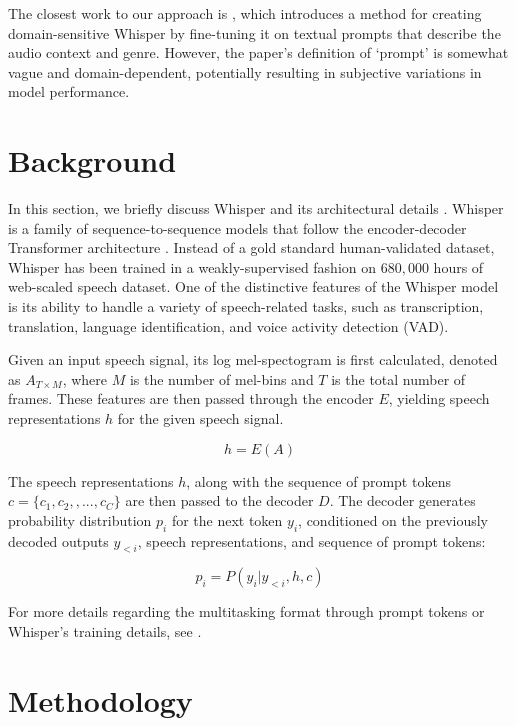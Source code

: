 \documentclass{article}
\begin{document}
The closest work to our approach is \cite{zeroshotdomain}, which introduces a method for creating domain-sensitive Whisper by fine-tuning it on textual prompts that describe the audio context and genre. However, the paper's definition of `prompt' is somewhat vague and domain-dependent, potentially resulting in subjective variations in model performance.



\section{Background}

In this section, we briefly discuss Whisper and its architectural details \cite{whisper}. Whisper is a family of sequence-to-sequence models that follow the encoder-decoder Transformer architecture \cite{attention}. Instead of a gold standard human-validated dataset, Whisper has been trained in a weakly-supervised fashion on $680,000$ hours of web-scaled speech dataset. One of the distinctive features of the Whisper model is its ability to handle a variety of speech-related tasks, such as transcription, translation, language identification, and voice activity detection (VAD).

Given an input speech signal, its log mel-spectogram is first calculated, denoted as $A_{T \times M}$, where $M$ is the number of mel-bins and $T$ is the total number of frames. These features are then passed through the encoder $E$, yielding speech representations $h$ for the given speech signal.

\begin{equation}
    h = E(A)
\end{equation}

The speech representations $h$, along with the sequence of prompt tokens $c=\{c_{1}, c_{2}, , ...,  c_{C}\}$ are then passed to the decoder $D$.  The decoder generates probability distribution $p_i$ for the next token $y_i$, conditioned on the previously decoded outputs $y_{<i}$, speech representations, and sequence of prompt tokens:

\begin{equation} \label{eq:1}
    p_i = P(y_i|y_{<i},h,c)
\end{equation}

For more details regarding the multitasking format through prompt tokens or Whisper's training details, see \cite{whisper}.

\section{Methodology}
\end{document}
